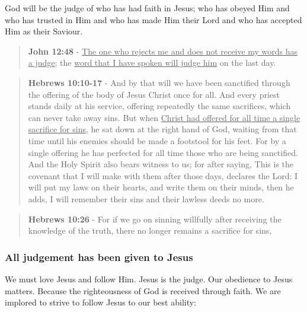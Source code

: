 \documentclass[11pt]{article}
\begin{document}
God will be the judge of who has had faith in Jesus; who has obeyed Him and who has trusted in Him and who has made Him their Lord and who has accepted Him as their Saviour.

\begin{quote}
\textbf{John 12:48} - \uline{The one who rejects me and does not receive my words has a judge}; the \uline{word that I have spoken will judge him} on the last day.
\end{quote}

\begin{quote}
\textbf{Hebrews 10:10-17} - And by that will we have been sanctified through the offering of the body of Jesus Christ once for all. And every priest stands daily at his service, offering repeatedly the same sacrifices, which can never take away sins. But when \uline{Christ had offered for all time a single sacrifice for sins,} he sat down at the right hand of God, waiting from that time until his enemies should be made a footstool for his feet. For by a single offering he has perfected for all time those who are being sanctified. And the Holy Spirit also bears witness to us; for after saying, This is the covenant that I will make with them after those days, declares the Lord: I will put my laws on their hearts, and write them on their minds, then he adds, I will remember their sins and their lawless deeds no more.
\end{quote}

\begin{quote}
\textbf{Hebrews 10:26} - For if we go on sinning willfully after receiving the knowledge of the truth, there no longer remains a sacrifice for sins,
\end{quote}

\subsubsection{All judgement has been given to Jesus}
\label{sec:org7ad52e6}
We must love Jesus and follow Him. Jesus is the judge.
Our obedience to Jesus matters. Because the righteousness of God is received through faith.
We are implored to strive to follow Jesus to our best ability:
\end{document}
